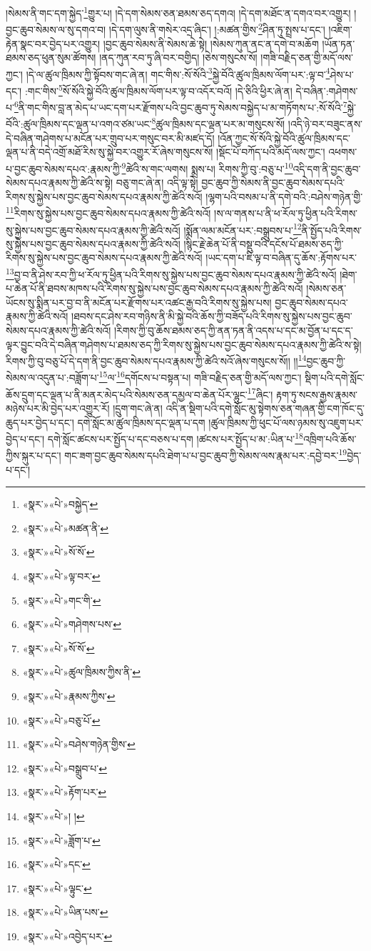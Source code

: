 །སེམས་ནི་གང་དག་སྐྱེད་\footnote{«སྣར་»«པེ་»བསྐྱེད་}གྱུར་པ། །དེ་དག་སེམས་ཅན་ཐམས་ཅད་དགའ། །དེ་དག་མཐོང་ན་དགའ་བར་འགྱུར། །བྱང་ཆུབ་སེམས་ལ་སུ་དགའ་བ། །དེ་དག་ལུས་ནི་གསེར་འདྲ་ཞིང་། །:མཚན་གྱིས་\footnote{«སྣར་»«པེ་»མཚན་ནི་}ཤིན་ཏུ་སྤྲས་པ་དང་། །འཇིག་རྟེན་སྣང་བར་བྱེད་པར་འགྱུར། །བྱང་ཆུབ་སེམས་ནི་སེམས་ཆེ་སྟེ། །སེམས་ཀུན་ནང་ན་དགེ་བ་མཆོག །ཡོན་ཏན་ཐམས་ཅད་ཕུན་སུམ་ཚོགས། །ནད་ཀུན་རབ་ཏུ་ཞི་བར་བགྱིད། །ཅེས་གསུངས་སོ། །གཟི་བརྗིད་ཅན་གྱི་མདོ་ལས་ཀྱང་། །དེ་ལ་ཚུལ་ཁྲིམས་ཀྱི་སྟོབས་གང་ཞེ་ན། གང་གིས་:སོ་སོའི་\footnote{«སྣར་»«པེ་»སོ་སོ་}སྐྱེ་བོའི་ཚུལ་ཁྲིམས་ལོག་པར་:ལྟ་བ་\footnote{«སྣར་»«པེ་»ལྟ་བར་}ཤེས་པ་དང་། :གང་གིས་\footnote{«སྣར་»«པེ་»གང་གི་}སོ་སོའི་སྐྱེ་བོའི་ཚུལ་ཁྲིམས་ལོག་པར་ལྟ་བ་འདོར་བའོ། །དེ་ཅིའི་ཕྱིར་ཞེ་ན། དེ་བཞིན་:གཤེགས་པ་\footnote{«སྣར་»«པེ་»གཤེགས་པས་}ནི་གང་གིས་བླ་ན་མེད་པ་ཡང་དག་པར་རྫོགས་པའི་བྱང་ཆུབ་ཏུ་སེམས་བསྐྱེད་པ་མ་གཏོགས་པ་:སོ་སོའི་\footnote{«སྣར་»«པེ་»སོ་སོ་}སྐྱེ་བོའི་:ཚུལ་ཁྲིམས་དང་ལྡན་པ་འགའ་ཙམ་ཡང་\footnote{«སྣར་»«པེ་»ཚུལ་ཁྲིམས་ཀྱིས་ནི་}ཚུལ་ཁྲིམས་དང་ལྡན་པར་མ་གསུངས་སོ། །འདི་ཉེ་བར་བཟུང་ནས་དེ་བཞིན་གཤེགས་པ་མངོན་པར་གྲུབ་པར་གསུང་བར་མི་མཛད་དོ། །འོན་ཀྱང་སོ་སོའི་སྐྱེ་བོའི་ཚུལ་ཁྲིམས་དང་ལྡན་པ་ནི་བདེ་འགྲོ་མཐོ་རིས་སུ་སྐྱེ་བར་འགྱུར་རོ་ཞེས་གསུངས་སོ། །སྡོང་པོ་བཀོད་པའི་མདོ་ལས་ཀྱང་། འཕགས་པ་བྱང་ཆུབ་སེམས་དཔའ་:རྣམས་ཀྱི་\footnote{«སྣར་»«པེ་»རྣམས་ཀྱིས་}ཚེའི་ས་གང་ལགས། སྨྲས་པ། རིགས་ཀྱི་བུ་:བཅུ་པ་\footnote{«སྣར་»«པེ་»བཅུ་པོ་}འདི་དག་ནི་བྱང་ཆུབ་སེམས་དཔའ་རྣམས་ཀྱི་ཚེའི་ས་སྟེ། བཅུ་གང་ཞེ་ན། འདི་ལྟ་སྟེ། བྱང་ཆུབ་ཀྱི་སེམས་ནི་བྱང་ཆུབ་སེམས་དཔའི་རིགས་སུ་སྐྱེས་པས་བྱང་ཆུབ་སེམས་དཔའ་རྣམས་ཀྱི་ཚེའི་སའོ། །ལྷག་པའི་བསམ་པ་ནི་དགེ་བའི་:བཤེས་གཉེན་གྱི་\footnote{«སྣར་»«པེ་»བཤེས་གཉེན་གྱིས་}རིགས་སུ་སྐྱེས་པས་བྱང་ཆུབ་སེམས་དཔའ་རྣམས་ཀྱི་ཚེའི་སའོ། །ས་ལ་གནས་པ་ནི་ཕ་རོལ་ཏུ་ཕྱིན་པའི་རིགས་སུ་སྐྱེས་པས་བྱང་ཆུབ་སེམས་དཔའ་རྣམས་ཀྱི་ཚེའི་སའོ། །སྨོན་ལམ་མངོན་པར་:བསྒྲུབས་པ་\footnote{«སྣར་»«པེ་»བསྒྲུབ་པ་}ནི་སྤྱོད་པའི་རིགས་སུ་སྐྱེས་པས་བྱང་ཆུབ་སེམས་དཔའ་རྣམས་ཀྱི་ཚེའི་སའོ། །སྙིང་རྗེ་ཆེན་པོ་ནི་བསྡུ་བའི་དངོས་པོ་ཐམས་ཅད་ཀྱི་རིགས་སུ་སྐྱེས་པས་བྱང་ཆུབ་སེམས་དཔའ་རྣམས་ཀྱི་ཚེའི་སའོ། །ཡང་དག་པ་ཇི་ལྟ་བ་བཞིན་དུ་ཆོས་:རྟོགས་པར་\footnote{«སྣར་»«པེ་»རྟོག་པར་}བྱ་བ་ནི་ཤེས་རབ་ཀྱི་ཕ་རོལ་ཏུ་ཕྱིན་པའི་རིགས་སུ་སྐྱེས་པས་བྱང་ཆུབ་སེམས་དཔའ་རྣམས་ཀྱི་ཚེའི་སའོ། །ཐེག་པ་ཆེན་པོ་ནི་ཐབས་མཁས་པའི་རིགས་སུ་སྐྱེས་པས་བྱང་ཆུབ་སེམས་དཔའ་རྣམས་ཀྱི་ཚེའི་སའོ། །སེམས་ཅན་ཡོངས་སུ་སྨིན་པར་བྱ་བ་ནི་མངོན་པར་རྫོགས་པར་འཚང་རྒྱ་བའི་རིགས་སུ་སྐྱེས་པས། བྱང་ཆུབ་སེམས་དཔའ་རྣམས་ཀྱི་ཚེའི་སའོ། །ཐབས་དང་ཤེས་རབ་གཉིས་ནི་མི་སྐྱེ་བའི་ཆོས་ཀྱི་བཟོད་པའི་རིགས་སུ་སྐྱེས་པས་བྱང་ཆུབ་སེམས་དཔའ་རྣམས་ཀྱི་ཚེའི་སའོ། །རིགས་ཀྱི་བུ་ཆོས་ཐམས་ཅད་ཀྱི་ནན་ཏན་ནི་འདས་པ་དང་མ་བྱོན་པ་དང་ད་ལྟར་བྱུང་བའི་དེ་བཞིན་གཤེགས་པ་ཐམས་ཅད་ཀྱི་རིགས་སུ་སྐྱེས་པས་བྱང་ཆུབ་སེམས་དཔའ་རྣམས་ཀྱི་ཚེའི་ས་སྟེ། རིགས་ཀྱི་བུ་བཅུ་པོ་དེ་དག་ནི་བྱང་ཆུབ་སེམས་དཔའ་རྣམས་ཀྱི་ཚེའི་སའོ་ཞེས་གསུངས་སོ།། །།\footnote{«སྣར་»«པེ་»། །}བྱང་ཆུབ་ཀྱི་སེམས་ལ་འདུན་པ་:བཟློག་པ་\footnote{«སྣར་»«པེ་»ཟློག་པ་}ལ་\footnote{«སྣར་»«པེ་»དང་}དགོངས་པ་བསྟན་པ། གཟི་བརྗིད་ཅན་གྱི་མདོ་ལས་ཀྱང་། སྡིག་པའི་དགེ་སློང་ཆོས་དྲུག་དང་ལྡན་པ་ནི་མནར་མེད་པའི་སེམས་ཅན་དམྱལ་བ་ཆེན་པོར་ལྷུང་\footnote{«སྣར་»«པེ་»ལྟུང་}ཞིང་། རྟག་ཏུ་སངས་རྒྱས་རྣམས་མཉེས་པར་མི་བྱེད་པར་འགྱུར་རོ། །དྲུག་གང་ཞེ་ན། འདི་ན་སྡིག་པའི་དགེ་སློང་མུ་སྟེགས་ཅན་གཞན་གྱི་ངག་ཁོང་དུ་ཆུད་པར་བྱེད་པ་དང་། དགེ་སློང་མ་ཚུལ་ཁྲིམས་དང་ལྡན་པ་དག །ཚུལ་ཁྲིམས་ཀྱི་ཕུང་པོ་ལས་ཉམས་སུ་འཇུག་པར་བྱེད་པ་དང་། དགེ་སློང་ཚངས་པར་སྤྱོད་པ་དང་བཅས་པ་དག །ཚངས་པར་སྤྱོད་པ་མ་:ཡིན་པ་\footnote{«སྣར་»«པེ་»ཡིན་པས་}འཁྲིག་པའི་ཆོས་ཀྱིས་སྐུར་པ་དང་། གང་ཟག་བྱང་ཆུབ་སེམས་དཔའི་ཐེག་པ་པ་བྱང་ཆུབ་ཀྱི་སེམས་ལས་རྣམ་པར་:དབྱེ་བར་\footnote{«སྣར་»«པེ་»འབྱེད་པར་}བྱེད་པ་དང་། 